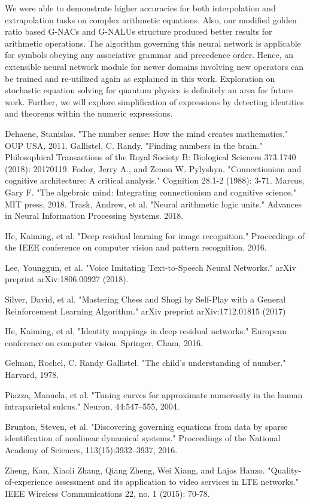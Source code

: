 \documentclass[conference]{IEEEtran}
\begin{document}
We were able to demonstrate higher accuracies for both interpolation and extrapolation tasks on complex arithmetic equations. Also, our modified golden ratio based G-NACs and G-NALUs structure produced better results for arithmetic operations. The algorithm governing this neural network is applicable for symbols obeying any associative grammar and precedence order. Hence, an extensible neural network module for newer domains involving new operators can be trained and re-utilized again as explained in this work.
Exploration on stochastic equation solving for quantum physics is definitely an area for future work. Further, we will explore simplification of expressions by detecting identities and theorems within the numeric expressions.

\begin{thebibliography}{00}


  Dehaene, Stanislas. "The number sense: How the mind creates mathematics." OUP USA, 2011.
 Gallistel, C. Randy. "Finding numbers in the brain." Philosophical Transactions of the Royal Society B: Biological Sciences 373.1740 (2018): 20170119.
Fodor, Jerry A., and Zenon W. Pylyshyn. "Connectionism and cognitive architecture: A critical analysis." Cognition 28.1-2 (1988): 3-71.
Marcus, Gary F. "The algebraic mind: Integrating connectionism and cognitive science." MIT press, 2018.
 Trask, Andrew, et al. "Neural arithmetic logic units." Advances in Neural Information Processing Systems. 2018.

 He, Kaiming, et al. "Deep residual learning for image recognition." Proceedings of the IEEE conference on computer vision and pattern recognition. 2016.

 Lee, Younggun, et al. "Voice Imitating Text-to-Speech Neural Networks." arXiv preprint arXiv:1806.00927 (2018).

 Silver, David, et al. "Mastering Chess and Shogi by Self-Play with a General Reinforcement Learning Algorithm." arXiv preprint arXiv:1712.01815 (2017)

 He, Kaiming, et al. "Identity mappings in deep residual networks." European conference on computer vision. Springer, Cham, 2016.

 Gelman, Rochel, C. Randy Gallistel. "The child’s understanding of number." Harvard, 1978.

 Piazza, Manuela, et al. "Tuning curves for approximate numerosity in the human intraparietal sulcus." Neuron, 44:547–555, 2004.

 Brunton, Steven, et al. "Discovering governing equations from data by sparse identification of nonlinear dynamical systems." Proceedings of the National Academy of Sciences, 113(15):3932–3937, 2016.

Zheng, Kan, Xiaoli Zhang, Qiang Zheng, Wei Xiang, and Lajos Hanzo. "Quality-of-experience assessment and its application to video services in LTE networks." IEEE Wireless Communications 22, no. 1 (2015): 70-78.

\end{thebibliography}

\vspace{12pt}
\end{document}
